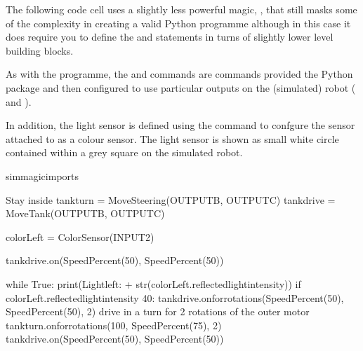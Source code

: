 \documentclass[letterpaper,10pt,english]{sphinxmanual}
\begin{document}
The following code cell uses a slightly less powerful magic, , that still masks some of the complexity in creating a valid Python programme although in this case it does require you to define the  and  statements in turns of slightly lower level building blocks.

As with the  programme, the  and  commands are commands provided the  Python package and then configured to use particular outputs on the (simulated) robot ( and ).

In addition, the light sensor is defined using the  command to confgure the sensor attached to  as a colour sensor. The light sensor is shown as small white circle contained within a grey square on the simulated robot.

{
\begin{sphinxVerbatim}[commandchars=\\\{\}]
\llap{\color{nbsphinxin}[ ]:\,\hspace{\fboxrule}\hspace{\fboxsep}}\PYGZpc{}\PYGZpc{}sim\PYGZus{}magic\PYGZus{}imports

\PYGZsh{} Stay inside
tank\PYGZus{}turn = MoveSteering(OUTPUT\PYGZus{}B, OUTPUT\PYGZus{}C)
tank\PYGZus{}drive = MoveTank(OUTPUT\PYGZus{}B, OUTPUT\PYGZus{}C)

colorLeft = ColorSensor(INPUT\PYGZus{}2)

tank\PYGZus{}drive.on(SpeedPercent(50), SpeedPercent(50))

while True:
    print(\PYGZsq{}Light\PYGZus{}left: \PYGZsq{} + str(colorLeft.reflected\PYGZus{}light\PYGZus{}intensity))
    if colorLeft.reflected\PYGZus{}light\PYGZus{}intensity \PYGZlt{} 40:
        tank\PYGZus{}drive.on\PYGZus{}for\PYGZus{}rotations(SpeedPercent(\PYGZhy{}50), SpeedPercent(\PYGZhy{}50), 2)
        \PYGZsh{} drive in a turn for 2 rotations of the outer motor
        tank\PYGZus{}turn.on\PYGZus{}for\PYGZus{}rotations(\PYGZhy{}100, SpeedPercent(75), 2)
        tank\PYGZus{}drive.on(SpeedPercent(50), SpeedPercent(50))
\end{sphinxVerbatim}
}
\end{document}
